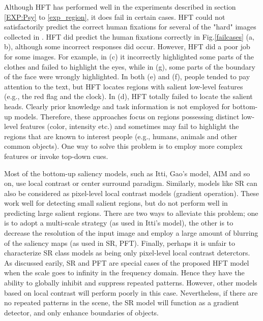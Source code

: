 \documentclass[10pt,journal,cspaper,compsoc]{IEEEtran}
\begin{document}
Although HFT has performed well in the  experiments described in section \ref{EXP:Psy}
 to \ref{exp_region}, it does fail in certain cases.   HFT could not satisfactorily predict the correct human fixations  for several of the "hard" images collected in \cite{judd2012pami}. HFT did predict the human fixations correctly in Fig.\ref{failcases} (a, b), although some incorrect responses did occur. However, HFT did a poor job for some images. For example, in (c) it incorrectly highlighted some parts of the clothes and failed to highlight the eyes, while in (g), some parts of the boundary  of the face were wrongly highlighted. In both (e) and (f), people tended to pay attention to the text, but HFT locates regions with salient low-level features (e.g., the red flag and the clock). In (d), HFT totally failed to locate the salient heads.
Clearly prior knowledge and task information is not employed for bottom-up models. Therefore, these approaches focus on regions possessing distinct low-level  features (color, intensity etc.) and sometimes may fail to highlight the regions that are known to interest people (e.g., humans, animals and other common objects). One way to solve this problem is to employ more complex features or invoke top-down cues.



Most of the bottom-up saliency models, such as Itti, Gao's model, AIM and so on, use local contrast or center surround paradigm. Similarly, models like SR can also be considered as pixel-level local contrast models (gradient operation). These work well for detecting small salient regions, but do not perform well in predicting large salient regions. There are two ways to alleviate this problem; one is to adopt a multi-scale strategy (as used in Itti's model), the other is to decrease the resolution of the input image and employ a large amount of blurring of the saliency maps (as used in SR, PFT).
Finally, perhaps it is unfair to characterize SR class models as being only pixel-level local contrast deterctors. As discussed earily, SR and PFT are special cases of the proposed HFT model when the scale goes to infinity in the frequency domain. Hence they have the ability to globally inhibit and suppress repeated patterns. However, other models based on local contrast will perform poorly in this case. Nevertheless, if there are no repeated patterns in the scene, the SR model will function as a gradient detector, and only enhance boundaries of objects.
\end{document}
